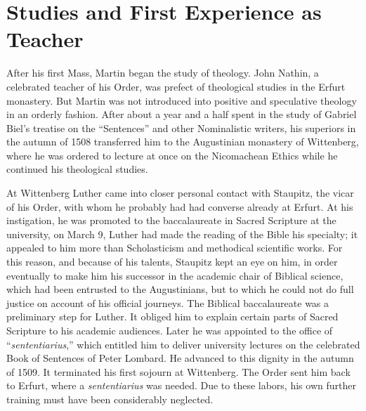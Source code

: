 \section{Studies and First Experience as Teacher}

After his first Mass, Martin began the study of theology. John
Nathin, a celebrated teacher of his Order, was prefect of theological
studies in the Erfurt monastery. But Martin was not introduced
into positive and speculative theology in an orderly fashion. After
about a year and a half spent in the study of Gabriel Biel’s treatise
on the “Sentences” and other Nominalistic writers, his superiors
in the autumn of 1508 transferred him to the Augustinian monastery
of Wittenberg, where he was ordered to lecture at once on the Nicomachean
Ethics while he continued his theological studies.

At Wittenberg Luther came into closer personal contact with
Staupitz, the vicar of his Order, with whom he probably had had
converse already at Erfurt. At his instigation, he was promoted to
the baccalaureate in Sacred Scripture at the university, on March 9,
Luther had made the reading of the Bible his specialty; it appealed
to him more than Scholasticism and methodical scientific
works. For this reason, and because of his talents, Staupitz kept an
eye on him, in order eventually to make him his successor in the
academic chair of Biblical science, which had been entrusted to the
Augustinians, but to which he could not do full justice on account
of his official journeys. The Biblical baccalaureate was a preliminary
step for Luther. It obliged him to explain certain parts of Sacred Scripture
to his academic audiences. Later he was appointed to the
office of “\textit{sententiarius},” which entitled him to deliver university
lectures on the celebrated Book of Sentences of Peter Lombard.
He advanced to this dignity in the autumn of 1509. It terminated
his first sojourn at Wittenberg. The Order sent him back to Erfurt,
where a \textit{sententiarius} was needed. Due to these labors, his own
further training must have been considerably neglected.

